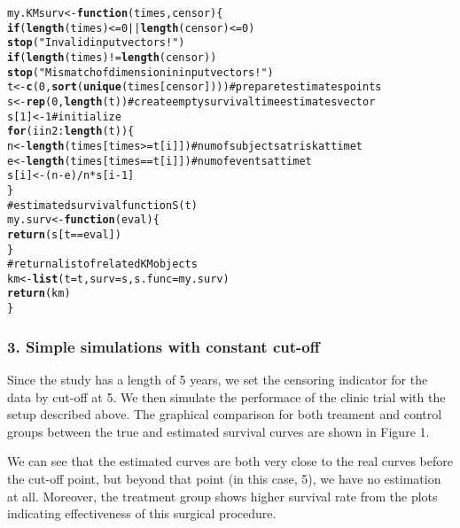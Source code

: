 \documentclass{article}\usepackage{graphicx, color}
\makeatletter
\newcommand{\hlfunctioncall}[1]{\textcolor[rgb]{0.501960784313725,0,0.329411764705882}{\textbf{#1}}}%
\newcommand{\hlstring}[1]{\textcolor[rgb]{0.6,0.6,1}{#1}}%
\newcommand{\hlcomment}[1]{\textcolor[rgb]{0.180392156862745,0.6,0.341176470588235}{#1}}%
\newenvironment{kframe}{%
 \def\at@end@of@kframe{}%
 \ifinner\ifhmode%
  \def\at@end@of@kframe{\end{minipage}}%
  \begin{minipage}{\columnwidth}%
 \fi\fi%
 \def\FrameCommand##1{\hskip\@totalleftmargin \hskip-\fboxsep
 \colorbox{shadecolor}{##1}\hskip-\fboxsep
     \hskip-\linewidth \hskip-\@totalleftmargin \hskip\columnwidth}%
 \MakeFramed {\advance\hsize-\width
   \@totalleftmargin\z@ \linewidth\hsize
   \@setminipage}}%
 {\par\unskip\endMakeFramed%
 \at@end@of@kframe}
\newenvironment{knitrout}{}{} %
\makeatother
\begin{document}
\begin{knitrout}
\color{fgcolor}\begin{kframe}
\begin{alltt}
my.KMsurv <- \hlfunctioncall{function}(times, censor) \{
    \hlfunctioncall{if} (\hlfunctioncall{length}(times) <= 0 || \hlfunctioncall{length}(censor) <= 0) 
        \hlfunctioncall{stop}(\hlstring{"Invalid input vectors!"})
    \hlfunctioncall{if} (\hlfunctioncall{length}(times) != \hlfunctioncall{length}(censor)) 
        \hlfunctioncall{stop}(\hlstring{"Mismatch of dimension in input vectors!"})
    t <- \hlfunctioncall{c}(0, \hlfunctioncall{sort}(\hlfunctioncall{unique}(times[censor])))  \hlcomment{# prepare t estimates points}
    s <- \hlfunctioncall{rep}(0, \hlfunctioncall{length}(t))  \hlcomment{# create empty survival time estimates vector}
    s[1] <- 1  \hlcomment{# initialize}
    \hlfunctioncall{for} (i in 2:\hlfunctioncall{length}(t)) \{
        n <- \hlfunctioncall{length}(times[times >= t[i]])  \hlcomment{# num of subjects at risk at time t}
        e <- \hlfunctioncall{length}(times[times == t[i]])  \hlcomment{# num of events at time t}
        s[i] <- (n - e)/n * s[i - 1]
    \}
\hlcomment{    # estimated survival function S(t)}
    my.surv <- \hlfunctioncall{function}(eval) \{
        \hlfunctioncall{return}(s[t == eval])
    \}
\hlcomment{    # return a list of related KM objects}
    km <- \hlfunctioncall{list}(t = t, surv = s, s.func = my.surv)
    \hlfunctioncall{return}(km)
\}
\end{alltt}
\end{kframe}
\end{knitrout}


\subsubsection*{3. Simple simulations with constant cut-off}
\hspace{12 pt} Since the study has a length of 5 years, we set the
censoring indicator for the data by cut-off at 5. We then
simulate the performace of the clinic trial with the setup described
above. The graphical comparison for both treament and control groups
between the true and estimated survival curves are shown in Figure 1.


We can see that the estimated curves are both very close to the real curves
before the cut-off point, but beyond that point (in this case, 5), we
have no estimation at all. Moreover, the treatment group shows higher
survival rate from the plots indicating effectiveness of this surgical procedure.
\end{document}
